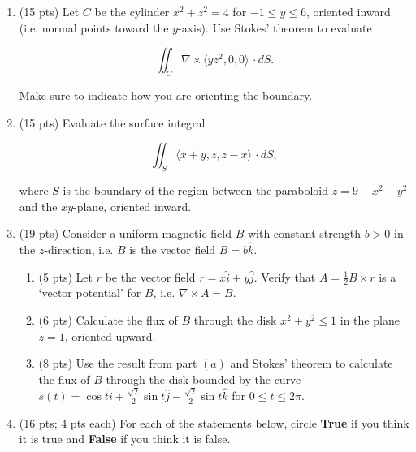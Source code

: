 \documentclass[12 pt]{report}
\begin{document}
\newpage
\begin{enumerate}

\item (15 pts) Let $C$ be the cylinder $x^2+z^2 = 4$ for $-1 \leq y \leq 6$, oriented inward (i.e. normal points toward the $y$-axis). Use Stokes' theorem to evaluate

\[
\iint_C \nabla \times \langle yz^2, 0, 0 \rangle \, \cdot dS.
\]

Make sure to indicate how you are orienting the boundary. 

\vfill

\newpage \item (15 pts) Evaluate the surface integral

\[
\iint_S \langle x+y, z, z-x \rangle \, \cdot dS,
\]

where $S$ is the boundary of the region between the paraboloid $z = 9-x^2-y^2$ and the $xy$-plane, oriented inward.

\vfill

\newpage \item (19 pts) Consider a uniform magnetic field $B$ with constant strength $b > 0$ in the $z$-direction, i.e. $B$ is the vector field $B = b \hat{k}$.

\begin{enumerate} \item (5 pts) Let $r$ be the vector field $r = x \hat{i} + y \hat{j}$. Verify that $A = \frac{1}{2} B \times r$ is a `vector potential' for $B$, i.e. $\nabla \times A = B$. 

\vfill

\item (6 pts) Calculate the flux of $B$ through the disk $x^2 + y^2 \leq 1$ in the plane $z = 1$, oriented upward. 

\vspace{4cm}

\item (8 pts) Use the result from part $(a)$ and Stokes' theorem to calculate the flux of $B$ through the disk bounded by the curve $s(t) = \cos t \hat{i} + \frac{\sqrt{2}}{2} \sin t \hat{j} - \frac{\sqrt{2}}{2} \sin t \hat{k}$ for $0 \leq t \leq 2\pi$. 

\vfill

\end{enumerate}

\newpage \item (16 pts; 4 pts each) For each of the statements below, circle \textbf{True} if you think it is true and \textbf{False} if you think it is false. 


\end{enumerate}
\end{document}
